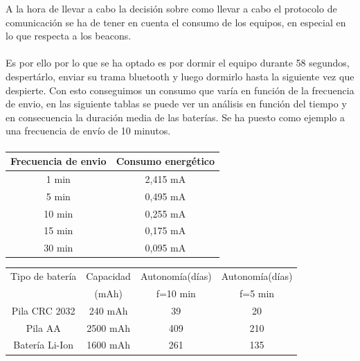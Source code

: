 \documentclass[a4paper ,12pt, onecolumn]{article}
\begin{document}
            A la hora de llevar a cabo la decisión sobre como llevar a cabo el protocolo de comunicación se ha de tener en cuenta 
            el consumo de los equipos, en especial en lo que respecta a los beacons.
            \paragraph{}
            Es por ello por lo que se ha optado es por dormir el equipo durante 58 segundos, despertárlo,
            enviar su trama bluetooth y luego dormirlo hasta la siguiente vez que despierte.
            Con esto conseguimos un consumo que varía en función de la frecuencia de envio, en las siguiente tablas
            se puede ver un análisis en función del tiempo y en consecuencia la duración media de las baterías.
            Se ha puesto como ejemplo a una frecuencia de envío de 10 minutos.
            \paragraph{}
            \begin{center}
                \begin{tabular}{||c || c ||} 
                \hline
                Frecuencia de envio  & Consumo energético  \\ [0.5ex] 
                \hline
                1 min &  2,415 mA \\
                5 min &  0,495 mA \\ 
                10 min &  0,255 mA \\ 
                15 min &  0,175 mA \\ 
                30 min &  0,095 mA \\ 
                \hline
                \end{tabular}
            \end{center}
            \begin{center}
                \begin{tabular}{|c | c| c| c |} 
                \hline
                    Tipo de batería & Capacidad  & Autonomía(días) & Autonomía(días)   \\ [0.5ex] 
                    & (mAh) &  f=10 min &  f=5 min   \\ [0.5ex] 
                \hline
                \hline
                    Pila CRC 2032 &  240 mAh  & 39   & 20 \\ 
                    Pila AA       &  2500 mAh & 409  & 210 \\ 
                    Batería Li-Ion&  1600 mAh & 261  & 135 \\ 
                \hline
                \end{tabular}
            \end{center}
\end{document}
